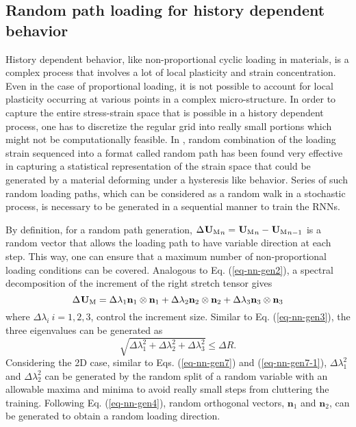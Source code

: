 \subsection{Random path loading for history dependent behavior}\label{nn-gendata-rand}
History dependent behavior, like non-proportional cyclic loading in materials, is a complex process that involves a lot of local plasticity and strain concentration. Even in the case of proportional loading, it is not possible to account for local plasticity occurring at various points in a complex micro-structure. In order to capture the entire stress-strain space that is possible in a history dependent process, one has to discretize the regular grid into really small portions which might not be computationally feasible. In \cite{wuRecurrentNeuralNetworkaccelerated2020}, random combination of the loading strain sequenced into a format called random path has been found very effective in capturing a statistical representation of the strain space that could be generated by a material deforming under a hysteresis like behavior. Series of such random loading paths, which can be considered as a random walk in a stochastic process, is necessary to be generated in a sequential manner to train the RNNs.

By definition, for a random path generation, $ \Delta{\tgm[]{U}}_n={\tgm[]{U}}_n-{\tgm[]{U}}_{n-1} $ is a random vector that allows the loading path to have variable direction at each step. This way, one can ensure that a maximum number of non-proportional loading conditions can be covered.
Analogous to Eq. (\ref{eq-nn-gen2}), a spectral decomposition of the increment of the right stretch tensor gives
\begin{equation}\label{eq-nn-gen5}
\Delta\tgm[]{U}=\Delta\lambda_1\textbf{n}_1\otimes\textbf{n}_1+\Delta\lambda_2\textbf{n}_2\otimes\textbf{n}_2+\Delta\lambda_3\textbf{n}_3\otimes\textbf{n}_3
\end{equation}
where $ \Delta\lambda_i\ i=1,2,3 $, control the increment size. Similar to Eq. (\ref{eq-nn-gen3}), the three eigenvalues can be generated as
\begin{equation}\label{eq-nn-gen6}
\sqrt{\Delta\lambda_1^2+\Delta\lambda_2^2+\Delta\lambda_3^2}\le \Delta R.
\end{equation}
Considering the 2D case, similar to Eqs. (\ref{eq-nn-gen7}) and (\ref{eq-nn-gen7-1}), $ \Delta\lambda_1^2 $ and $ \Delta\lambda_2^2 $ can be generated by the random split of a random variable with an allowable maxima and minima to avoid really small steps from cluttering the training. Following Eq. (\ref{eq-nn-gen4}), random orthogonal vectors, $ \textbf{n}_1 $ and $ \textbf{n}_2 $, can be generated to obtain a random loading direction.

